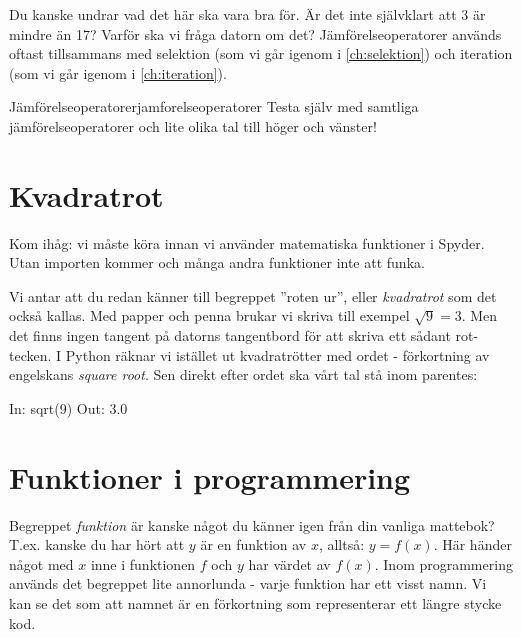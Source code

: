 Du kanske undrar vad det här ska vara bra för. Är det inte självklart att 3 är mindre än 17? Varför ska vi fråga datorn om det? Jämförelseoperatorer används oftast tillsammans med selektion (som vi går igenom i \autoref{ch:selektion}) och iteration (som vi går igenom i \autoref{ch:iteration}).


\begin{matteovning}{Jämförelseoperatorer}{jamforelseoperatorer}
Testa själv med samtliga jämförelseoperatorer och lite olika tal till höger och vänster!
\end{matteovning}
\newpage

\section{Kvadratrot}

Kom ihåg: vi måste köra  innan vi använder matematiska funktioner i Spyder. Utan importen kommer  och många andra funktioner inte att funka.

Vi antar att du redan känner till begreppet ''roten ur'', eller \emph{kvadratrot} som det också kallas. Med papper och penna brukar vi skriva till exempel $\sqrt9 = 3$. Men det finns ingen tangent på datorns tangentbord för att skriva ett sådant rot-tecken. I Python räknar vi istället ut kvadratrötter med ordet  - förkortning av engelskans \emph{square root}. Sen direkt efter ordet  ska vårt tal stå inom parentes:

\begin{python}[caption={Kvadratrot, roten ur 9},label={}]
In: sqrt(9)
Out: 3.0	
\end{python}


\section{Funktioner i programmering}

Begreppet \emph{funktion} är kanske något du känner igen från din vanliga mattebok? T.ex. kanske du har hört att $y$ är en funktion av $x$, alltså: $y=f(x)$. Här händer något med $x$ inne i funktionen $f$ och $y$ har värdet av $f(x)$. Inom programmering används det begreppet lite annorlunda - varje funktion har ett visst namn. Vi kan se det som att namnet är en förkortning som representerar ett längre stycke kod.

